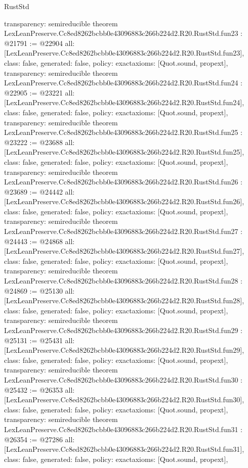\begin{lexlean}{RustStd}
\begin{coremodule}
{  transparency: semireducible
}
theorem LexLeanPreserve.Cc8ed8262bcbb0e43096883c266b224d2.R20.RustStd.fun23 : @21791 := @22904 {
  all: [LexLeanPreserve.Cc8ed8262bcbb0e43096883c266b224d2.R20.RustStd.fun23],
  class: false,
  generated: false,
  policy: exact{axioms: [Quot.sound, propext]},
  transparency: semireducible
}
theorem LexLeanPreserve.Cc8ed8262bcbb0e43096883c266b224d2.R20.RustStd.fun24 : @22905 := @23221 {
  all: [LexLeanPreserve.Cc8ed8262bcbb0e43096883c266b224d2.R20.RustStd.fun24],
  class: false,
  generated: false,
  policy: exact{axioms: [Quot.sound, propext]},
  transparency: semireducible
}
theorem LexLeanPreserve.Cc8ed8262bcbb0e43096883c266b224d2.R20.RustStd.fun25 : @23222 := @23688 {
  all: [LexLeanPreserve.Cc8ed8262bcbb0e43096883c266b224d2.R20.RustStd.fun25],
  class: false,
  generated: false,
  policy: exact{axioms: [Quot.sound, propext]},
  transparency: semireducible
}
theorem LexLeanPreserve.Cc8ed8262bcbb0e43096883c266b224d2.R20.RustStd.fun26 : @23689 := @24442 {
  all: [LexLeanPreserve.Cc8ed8262bcbb0e43096883c266b224d2.R20.RustStd.fun26],
  class: false,
  generated: false,
  policy: exact{axioms: [Quot.sound, propext]},
  transparency: semireducible
}
theorem LexLeanPreserve.Cc8ed8262bcbb0e43096883c266b224d2.R20.RustStd.fun27 : @24443 := @24868 {
  all: [LexLeanPreserve.Cc8ed8262bcbb0e43096883c266b224d2.R20.RustStd.fun27],
  class: false,
  generated: false,
  policy: exact{axioms: [Quot.sound, propext]},
  transparency: semireducible
}
theorem LexLeanPreserve.Cc8ed8262bcbb0e43096883c266b224d2.R20.RustStd.fun28 : @24869 := @25130 {
  all: [LexLeanPreserve.Cc8ed8262bcbb0e43096883c266b224d2.R20.RustStd.fun28],
  class: false,
  generated: false,
  policy: exact{axioms: [Quot.sound, propext]},
  transparency: semireducible
}
theorem LexLeanPreserve.Cc8ed8262bcbb0e43096883c266b224d2.R20.RustStd.fun29 : @25131 := @25431 {
  all: [LexLeanPreserve.Cc8ed8262bcbb0e43096883c266b224d2.R20.RustStd.fun29],
  class: false,
  generated: false,
  policy: exact{axioms: [Quot.sound, propext]},
  transparency: semireducible
}
theorem LexLeanPreserve.Cc8ed8262bcbb0e43096883c266b224d2.R20.RustStd.fun30 : @25432 := @26353 {
  all: [LexLeanPreserve.Cc8ed8262bcbb0e43096883c266b224d2.R20.RustStd.fun30],
  class: false,
  generated: false,
  policy: exact{axioms: [Quot.sound, propext]},
  transparency: semireducible
}
theorem LexLeanPreserve.Cc8ed8262bcbb0e43096883c266b224d2.R20.RustStd.fun31 : @26354 := @27286 {
  all: [LexLeanPreserve.Cc8ed8262bcbb0e43096883c266b224d2.R20.RustStd.fun31],
  class: false,
  generated: false,
  policy: exact{axioms: [Quot.sound, propext]},
}
\end{coremodule}
\end{lexlean}
